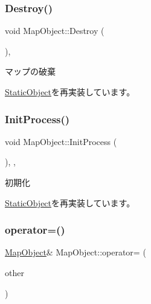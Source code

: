 \subsubsection{\texorpdfstring{Destroy()}{Destroy()}}
{\footnotesize\ttfamily void Map\+Object\+::\+Destroy (\begin{DoxyParamCaption}{ }\end{DoxyParamCaption})\hspace{0.3cm}{\ttfamily [final]}, {\ttfamily [virtual]}}



マップの破棄 



\mbox{\hyperlink{class_static_object_a8e9fb321b4f8f12c4bec1bc66853512f}{Static\+Object}}を再実装しています。

\mbox{\label{class_map_object_a3043cddb8aaad0eab27a076e9bee0284}} 
\subsubsection{\texorpdfstring{Init\+Process()}{InitProcess()}}
{\footnotesize\ttfamily void Map\+Object\+::\+Init\+Process (\begin{DoxyParamCaption}{ }\end{DoxyParamCaption})\hspace{0.3cm}{\ttfamily [final]}, {\ttfamily [protected]}, {\ttfamily [virtual]}}



初期化 



\mbox{\hyperlink{class_static_object_afa0709f50495338a23c1140062a567af}{Static\+Object}}を再実装しています。

\mbox{\label{class_map_object_a4ff3c31cc463a650e4d870ea65b65c58}} 
\subsubsection{\texorpdfstring{operator=()}{operator=()}\hspace{0.1cm}{\footnotesize\ttfamily [1/2]}}
{\footnotesize\ttfamily \mbox{\hyperlink{class_map_object}{Map\+Object}}\& Map\+Object\+::operator= (\begin{DoxyParamCaption}\item[{const \mbox{\hyperlink{class_map_object}{Map\+Object}} \&}]{other }\end{DoxyParamCaption})\hspace{0.3cm}{\ttfamily [inline]}}



